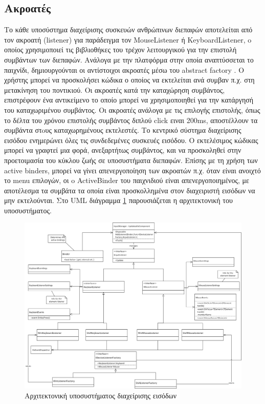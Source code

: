 	\subsection{Ακροατές}
	Το κάθε υποσύστημα διαχείρισης συσκευών ανθρώπινων διεπαφών αποτελείται από τον ακροατή (listener) για παράδειγμα τον MouseListener ή KeyboardListener, o οποίος χρησιμοποιεί τις βιβλιοθήκες του τρέχον λειτουργικού για την επιστολή συμβάντων των διεπαφών. Ανάλογα με την πλατφόρμα στην οποία αναπτύσσεται το παιχνίδι, δημιουργούνται οι αντίστοιχοι ακροατές μέσω του abstract factory \cite{Gamma:1995:DPE:186897}.
	Ο χρήστης μπορεί να προσκολήσει κώδικα ο οποίος να εκτελείται ανά συμβαν π.χ. στη μετακίνηση του ποντικιού. Οι ακροατές κατά την καταχώρηση συμβάντος, επιστρέφουν ένα αντικείμενο το οποίο μπορεί να χρησιμοποιηθεί για την κατάργησή του καταχωριμένου συμβάντος. Οι ακροατές ανάλογα με τις επιλογής επιστολής, όπως το δέλτα του χρόνου επιστολής συμβάντος διπλού click ειναι 200ms, αποστέλλουν τα συμβάντα στoυς καταχωρημένους εκτελεστές. Το κεντρικό σύστημα διαχείρισης εισόδου ενημερώνει όλες τις συνδεδεμένες συσκευές εισόδου. 
	Ο εκτελέσιμος κώδικας μπορεί να γραφτεί μια φορά, ανεξαρτήτως συμβάντος, και να προσκοληθεί στην προετοιμασία του κύκλου ζωής σε υποσυστήματα διεπαφών. Επίσης με τη χρήση των active binders, μπορεί να γίνει απενεργοποίηση των ακροατών π.χ. όταν είναι ανοιχτό το menu επιλογών, οι o ActiveBinder του παιχνιδιού είναι απενεργοποιημένος, με αποτέλεσμα τα συμβάτα τα οποία είναι προσκολλημένα στον διαχειριστή εισόδων να μην εκτελούνται. Στο \gls{UML} διάγραμμα \ref{fig:core_input} παρουσιάζεται η αρχιτεκτονική του υποσυστήματος.
	
	
	\begin{figure}[h!]
		\centering
		\includegraphics[width=165mm]{Images/core_input}
		\caption{Αρχιτεκτονική υποσυστήματος διαχείρισης εισόδων}
		\label{fig:core_input}
	\end{figure}
		
